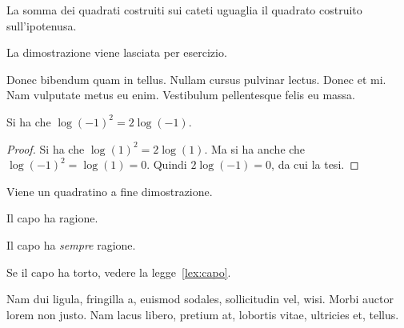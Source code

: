 \lipsum[2]

\begin{teorema}[di Pitagora]
La somma dei quadrati costruiti sui cateti uguaglia il quadrato costruito sull'ipotenusa.
\end{teorema}
La dimostrazione viene lasciata per esercizio.

Donec bibendum quam in tellus. Nullam cursus pulvinar lectus. Donec et mi. Nam vulputate metus eu enim. Vestibulum pellentesque felis eu massa.
\begin{teorema}[Sorpresa]
Si ha che $\log(-1)^2=2\log(-1)$.
\end{teorema} 
\begin{proof} 
Si ha che $\log(1)^2 = 2\log(1)$.
Ma si ha anche che $\log(-1)^2=\log(1)=0$.
Quindi $2\log(-1)=0$, da cui la tesi.
\end{proof}
Viene un quadratino a fine dimostrazione.
\begin{legge}
\label{lex:capo}
Il capo ha ragione.
\end{legge}
\begin{decreto}
Il capo ha \emph{sempre} ragione.
\end{decreto}
\begin{legge}
Se il capo ha torto, vedere la 
legge~\ref{lex:capo}.
\end{legge}

Nam dui ligula, fringilla a, euismod sodales, sollicitudin vel, wisi. Morbi auctor lorem non justo. Nam lacus libero, pretium at, lobortis vitae, ultricies et, tellus.

